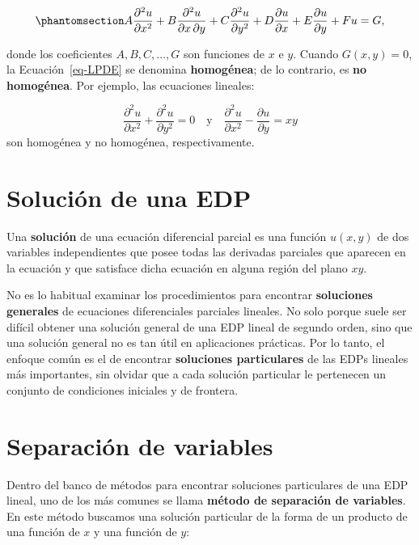 \documentclass[
  spanish,
  us-letterpaper,
]{scrreprt}
\theoremstyle{definition}
\theoremstyle{plain}
\theoremstyle{remark}
\begin{document}
\begin{equation}\phantomsection\label{eq-LPDE}{
A \dfrac{\partial^2 u}{\partial x^2} + B \dfrac{\partial^2 u}{\partial x \, \partial y} + C \dfrac{\partial^2 u}{\partial y^2} + D \dfrac{\partial u}{\partial x} + E \dfrac{\partial u}{\partial y} + F u = G,
}\end{equation}

donde los coeficientes \(A, B, C, \dots, G\) son funciones de \(x\) e
\(y\). Cuando \(G(x, y) = 0\), la Ecuación~\ref{eq-LPDE} se denomina
\textbf{homogénea}; de lo contrario, es \textbf{no homogénea}. Por
ejemplo, las ecuaciones lineales:

\[
\dfrac{\partial^2 u}{\partial x^2} + \dfrac{\partial^2 u}{\partial y^2} = 0 \quad\text{y} \quad \dfrac{\partial^2 u}{\partial x^2} - \dfrac{\partial u}{\partial y} = x y
\] son homogénea y no homogénea, respectivamente.

\section{Solución de una EDP}\label{soluciuxf3n-de-una-edp}

Una \textbf{solución} de una ecuación diferencial parcial es una función
\(u(x, y)\) de dos variables independientes que posee todas las
derivadas parciales que aparecen en la ecuación y que satisface dicha
ecuación en alguna región del plano \(xy\).

No es lo habitual examinar los procedimientos para encontrar
\textbf{soluciones generales} de ecuaciones diferenciales parciales
lineales. No solo porque suele ser difícil obtener una solución general
de una EDP lineal de segundo orden, sino que una solución general no es
tan útil en aplicaciones prácticas. Por lo tanto, el enfoque común es el
de encontrar \textbf{soluciones particulares} de las EDPs lineales más
importantes, sin olvidar que a cada solución particular le pertenecen un
conjunto de condiciones iniciales y de frontera.

\section{Separación de variables}\label{separaciuxf3n-de-variables}

Dentro del banco de métodos para encontrar soluciones particulares de
una EDP lineal, uno de los más comunes se llama \textbf{método de
separación de variables}. En este método buscamos una solución
particular de la forma de un producto de una función de \(x\) y una
función de \(y\):
\end{document}
